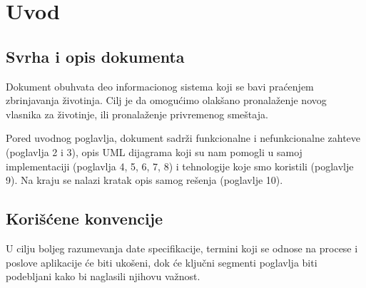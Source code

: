 \section{Uvod}
\subsection{Svrha i opis dokumenta}
\par Dokument obuhvata deo informacionog sistema koji se bavi praćenjem zbrinjavanja životinja. Cilj je da omogućimo olakšano pronalaženje novog vlasnika za životinje, ili
pronalaženje privremenog smeštaja.
\par Pored uvodnog poglavlja, dokument sadrži funkcionalne i nefunkcionalne zahteve (poglavlja 2 i 3), opis UML dijagrama koji su nam pomogli u samoj 
implementaciji (poglavlja 4, 5, 6, 7, 8) i tehnologije koje smo koristili (poglavlje 9). Na kraju se nalazi kratak opis samog rešenja (poglavlje 10).
\subsection{Korišćene konvencije}
\par U cilju boljeg razumevanja date specifikacije, termini koji se odnose na procese i poslove aplikacije će biti ukošeni, dok će ključni segmenti poglavlja
biti podebljani kako bi naglasili njihovu važnost.